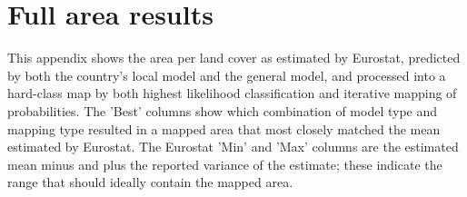 \section{Full area results}
\label{appendix:full_area_results}
This appendix shows the area per land cover as estimated by Eurostat, predicted by both the country's local model and the general model, and processed into a hard-class map by both highest likelihood classification and iterative mapping of probabilities. The 'Best' columns show which combination of model type and mapping type resulted in a mapped area that most closely matched the mean estimated by Eurostat. The Eurostat 'Min' and 'Max' columns are the estimated mean minus and plus the reported variance of the estimate; these indicate the range that should ideally contain the mapped area. 



